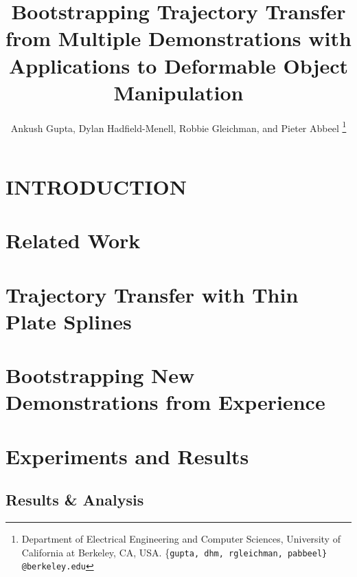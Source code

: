 \documentclass[a4paper, 10pt, conference]{ieeeconf}      %
\title{\LARGE \bf
Bootstrapping Trajectory Transfer from Multiple Demonstrations with Applications to Deformable Object Manipulation
}
\author{Ankush Gupta, Dylan Hadfield-Menell, Robbie Gleichman, and Pieter Abbeel%
\thanks{Department of Electrical Engineering and Computer Sciences, University of California at Berkeley, CA, USA.
  \{\tt\small gupta, dhm, rgleichman, pabbeel\} @berkeley.edu}}
\begin{document}

\maketitle
\thispagestyle{empty}
\pagestyle{empty}


\begin{abstract}

\end{abstract}


\section{INTRODUCTION}

\section{Related Work}


\section{Trajectory Transfer with Thin Plate Splines}


\section{Bootstrapping New Demonstrations from Experience}


\section{Experiments and Results}

\subsection{Results \& Analysis}




\end{document}
